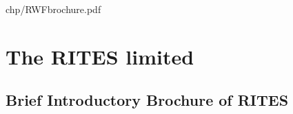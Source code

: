 

%


{chp/RWFbrochure.pdf}


\chapter[The RITES limited]{The RITES limited}
\renewcommand\chapterillustration{img/RITESlogo3.jpg}

\section{Brief Introductory Brochure of RITES}
 

